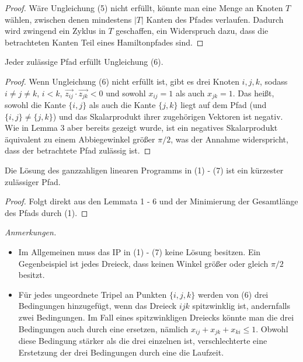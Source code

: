 \documentclass[a4paper, 10pt, ngerman]{article}
\begin{document}
\begin{proof}
    Wäre Ungleichung (5) nicht erfüllt, könnte man eine Menge an Knoten $T$ wählen, zwischen denen mindestens $|T|$ Kanten des Pfades verlaufen. Dadurch wird zwingend ein Zyklus in $T$ geschaffen, ein Widerspruch dazu, dass die betrachteten Kanten Teil eines Hamiltonpfades sind.
\end{proof}

\begin{lemma}
    Jeder zulässige Pfad erfüllt Ungleichung (6).
\end{lemma}

\begin{proof}
    Wenn Ungleichung (6) nicht erfüllt ist, gibt es drei Knoten $i, j, k$, sodass $i \ne j \ne k$, $i < k$, $\vec{z_{ij}} \cdot \vec{z_{jk}} < 0$ und sowohl $x_{ij} = 1$ als auch $x_{jk} = 1$. Das heißt, sowohl die Kante $\{i, j\}$ als auch die Kante $\{j, k\}$ liegt auf dem Pfad (und $\{i, j\} \ne \{j, k\}$) und das Skalarprodukt ihrer zugehörigen Vektoren ist negativ. Wie in Lemma 3 aber bereits gezeigt wurde, ist ein negatives Skalarprodukt äquivalent zu einem Abbiegewinkel größer $\pi / 2$, was der Annahme widerspricht, dass der betrachtete Pfad zulässig ist.
\end{proof}

\begin{theorem}
    Die Lösung des ganzzahligen linearen Programms in (1) - (7) ist ein kürzester zulässiger Pfad. 
\end{theorem}

\begin{proof}
    Folgt direkt aus den Lemmata 1 - 6 und der Minimierung der Gesamtlänge des Pfads durch (1).
\end{proof}

\emph{Anmerkungen.} 
\begin{itemize}
    \item Im Allgemeinen muss das IP in (1) - (7) keine Lösung besitzen. Ein Gegenbeispiel ist jedes Dreieck, dass keinen Winkel größer oder gleich $\pi / 2$ besitzt.
    \item Für jedes ungeordnete Tripel an Punkten $\{i, j, k\}$ werden von (6) drei Bedingungen hinzugefügt, wenn das Dreieck $ijk$ spitzwinklig ist, andernfalls zwei Bedingungen. Im Fall eines spitzwinkligen Dreiecks könnte man die drei Bedingungen auch durch eine ersetzen, nämlich $x_{ij} + x_{jk} + x_{ki} \le 1$. Obwohl diese Bedingung stärker als die drei einzelnen ist, verschlechterte eine Erstetzung der drei Bedingungen durch eine die Laufzeit.
\end{itemize} 
\end{document}
